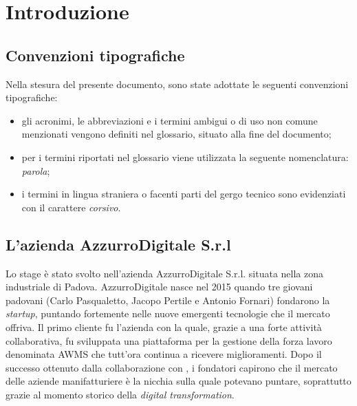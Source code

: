 
\chapter{Introduzione}
\label{cap:introduzione}

\section{Convenzioni tipografiche}
Nella stesura del presente documento, sono state adottate le seguenti convenzioni tipografiche:
\begin{itemize}
	\item gli acronimi, le abbreviazioni e i termini ambigui o di uso non comune menzionati vengono definiti nel glossario, situato alla fine del documento;
	\item per i termini riportati nel glossario viene utilizzata la seguente nomenclatura: \emph{parola}\textcolor{SchoolColor}{\ap{[g]}};
	\item i termini in lingua straniera o facenti parti del gergo tecnico sono evidenziati con il carattere \emph{corsivo}.
\end{itemize}

\section{L'azienda AzzurroDigitale S.r.l}

Lo stage è stato svolto nell'azienda AzzurroDigitale S.r.l. situata nella zona industriale di Padova. AzzurroDigitale nasce nel 2015 quando tre giovani padovani (Carlo Pasqualetto, Jacopo Pertile e Antonio Fornari) fondarono la \emph{startup}, puntando fortemente nelle nuove emergenti tecnologie che il mercato offriva. Il primo cliente fu l'azienda  con la quale, grazie a una forte attività collaborativa, fu sviluppata una piattaforma per la gestione della forza lavoro denominata \gls{AWMS} che tutt’ora continua a ricevere miglioramenti. Dopo il successo ottenuto dalla collaborazione con , i fondatori capirono che il mercato delle aziende manifatturiere è la nicchia sulla quale potevano puntare, soprattutto grazie al momento storico della \emph{digital transformation}. 

